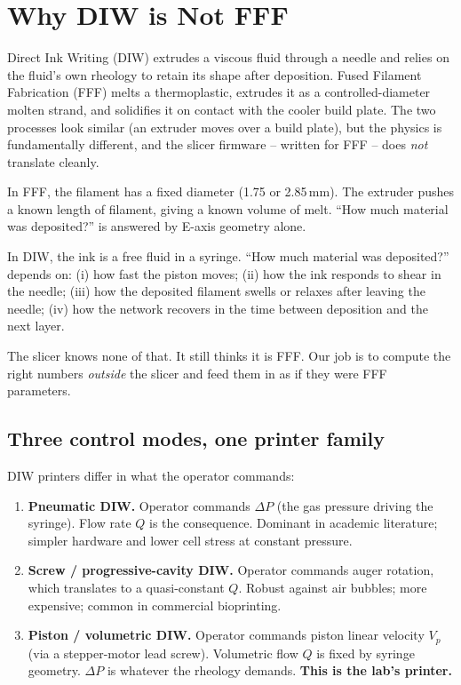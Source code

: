 \documentclass[11pt,a4paper]{article}
\begin{document}
\section{Why DIW is Not FFF}
\label{sec:diw_vs_fff}

Direct Ink Writing (DIW) extrudes a viscous fluid through a needle and
relies on the fluid's own rheology to retain its shape after deposition.
Fused Filament Fabrication (FFF) melts a thermoplastic, extrudes it as a
controlled-diameter molten strand, and solidifies it on contact with the
cooler build plate. The two processes look similar (an extruder moves over
a build plate), but the physics is fundamentally different, and the slicer
firmware -- written for FFF -- does \emph{not} translate cleanly.

\begin{intuitionbox}
In FFF, the filament has a fixed diameter (1.75 or 2.85\,mm). The
extruder pushes a known length of filament, giving a known volume of melt.
``How much material was deposited?'' is answered by E-axis geometry alone.

In DIW, the ink is a free fluid in a syringe. ``How much material was
deposited?'' depends on: (i) how fast the piston moves; (ii) how the ink
responds to shear in the needle; (iii) how the deposited filament swells
or relaxes after leaving the needle; (iv) how the network recovers in the
time between deposition and the next layer.

The slicer knows none of that. It still thinks it is FFF. Our job is to
compute the right numbers \emph{outside} the slicer and feed them in as if
they were FFF parameters.
\end{intuitionbox}

\subsection{Three control modes, one printer family}

DIW printers differ in what the operator commands:

\begin{enumerate}[leftmargin=1.6em,itemsep=2pt]
\item \textbf{Pneumatic DIW.} Operator commands $\Delta P$ (the gas
pressure driving the syringe). Flow rate $Q$ is the consequence.
Dominant in academic literature; simpler hardware and lower cell stress
at constant pressure.
\item \textbf{Screw / progressive-cavity DIW.} Operator commands auger
rotation, which translates to a quasi-constant $Q$. Robust against air
bubbles; more expensive; common in commercial bioprinting.
\item \textbf{Piston / volumetric DIW.} Operator commands piston linear
velocity $V_p$ (via a stepper-motor lead screw). Volumetric flow $Q$ is
fixed by syringe geometry. $\Delta P$ is whatever the rheology demands.
\textbf{This is the lab's printer.}
\end{enumerate}
\end{document}
